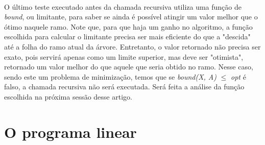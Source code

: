 \documentclass{article}
\begin{document}
\paragraph{} O último teste executado antes da chamada recursiva utiliza uma função de \emph{bound}, ou limitante, para saber se ainda é possível atingir um valor melhor que o ótimo naquele ramo. Note que, para que haja um ganho no algoritmo, a função escolhida para calcular o limitante precisa ser mais eficiente do que a "descida" até a folha do ramo atual da árvore. Entretanto, o valor retornado não precisa ser exato, pois servirá apenas como um limite superior, mas deve ser "otimista", retornado um valor melhor do que aquele que seria obtido no ramo. Nesse caso, sendo este um problema de minimização, temos que se \emph{bound(X, A)} $\leq$ \emph{opt} é falso, a chamada recursiva não será executada. Será feita a análise da função escolhida na próxima sessão desse artigo.

\section{O programa linear}
\end{document}
